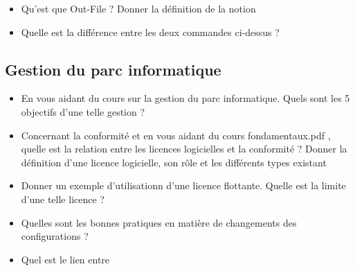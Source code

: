 \documentclass[12pt, letterpaper]{article}
\begin{document}
\begin{itemize}
    \item Qu'est que Out-File ? Donner la définition de la notion
    \item Quelle est la différence entre les deux commandes ci-dessus ?
\end{itemize}

\subsection*{Gestion du parc informatique}

\begin{itemize}
    \item En vous aidant du cours sur la gestion du parc informatique. Quels sont les 5 objectifs d'une telle gestion ?
    \item Concernant la conformité et en vous aidant du cours fondamentaux.pdf , quelle est la relation entre les licences logicielles et la conformité ? Donner la définition d'une licence logicielle, son rôle et les différents types existant
    \item Donner un exemple d'utilisationn d'une licence flottante. Quelle est la limite d'une telle licence ?
    \item Quelles sont les bonnes pratiques en matière de changements des configurations ?
    \item Quel est le lien entre 
\end{itemize}
\end{document}
